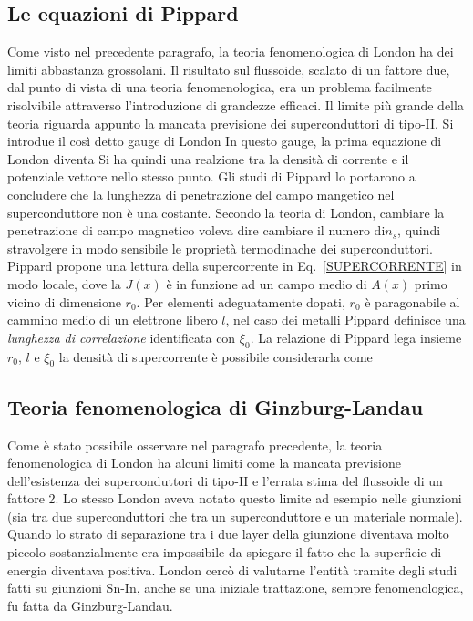 \subsection{Le equazioni di Pippard}
Come visto nel precedente paragrafo, la teoria fenomenologica di London ha dei limiti abbastanza grossolani. Il risultato sul flussoide, scalato di un fattore due, dal punto di vista di una teoria fenomenologica, era un problema facilmente risolvibile attraverso l'introduzione di grandezze efficaci. Il limite pi\`u grande della teoria riguarda appunto la mancata previsione dei superconduttori di tipo-II. Si introdue il cos\`i detto gauge di London
In questo gauge, la prima equazione di London diventa
Si ha quindi una realzione tra la densit\`a di corrente e il potenziale vettore nello stesso punto. Gli studi di Pippard lo portarono a concludere che la lunghezza di penetrazione del campo mangetico nel superconduttore non \`e una costante. Secondo la teoria di London, cambiare la penetrazione di campo magnetico voleva dire cambiare il numero di$ n_s$, quindi stravolgere in modo sensibile le propriet\`a termodinache dei superconduttori. Pippard propone una lettura della supercorrente in Eq.~\ref{SUPERCORRENTE} in modo locale, dove la $J(x)$ \`e in funzione ad un campo medio di $A(x)$ primo vicino di dimensione $r_0$. Per elementi adeguatamente dopati, $r_0$ \`e paragonabile al cammino medio di un elettrone libero $l$, nel caso dei metalli Pippard definisce una \textit{lunghezza di correlazione} identificata con $\xi_0$. La relazione di Pippard lega insieme $r_0$, $l$ e $\xi_0$
la densit\`a di supercorrente \`e possibile considerarla come





\subsection{Teoria fenomenologica di Ginzburg-Landau}
Come \`e stato possibile osservare nel paragrafo precedente, la teoria fenomenologica di London ha alcuni limiti come la mancata previsione dell'esistenza dei superconduttori di tipo-II e l'errata stima del flussoide di un fattore 2. Lo stesso London aveva notato questo limite ad esempio nelle giunzioni (sia tra due superconduttori che tra un superconduttore e un materiale normale). Quando lo strato di separazione tra i due layer della giunzione diventava molto piccolo sostanzialmente era impossibile da spiegare il fatto che la superficie di energia diventava positiva. London cerc\`o di valutarne l'entit\`a tramite degli studi fatti su giunzioni Sn-In, anche se una iniziale trattazione, sempre fenomenologica, fu fatta da Ginzburg-Landau.
